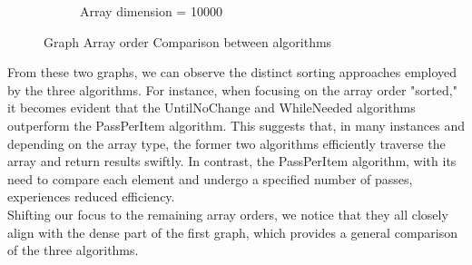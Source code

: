 \documentclass{article}
\begin{document}
\begin{figure}[H]
\begin{subfigure}[b]{0.48\textwidth}
        \caption{Array dimension = 10000}
    \end{subfigure}
    \caption{Graph Array order Comparison between algorithms} 
\end{figure}

From these two graphs, we can observe the distinct sorting approaches employed by the three algorithms. For instance, when focusing on the array order "sorted," it becomes evident that the UntilNoChange and WhileNeeded algorithms outperform the PassPerItem algorithm. This suggests that, in many instances and depending on the array type, the former two algorithms efficiently traverse the array and return results swiftly. In contrast, the PassPerItem algorithm, with its need to compare each element and undergo a specified number of passes, experiences reduced efficiency.\\

Shifting our focus to the remaining array orders, we notice that they all closely align with the dense part of the first graph, which provides a general comparison of the three algorithms.\\
\end{document}
